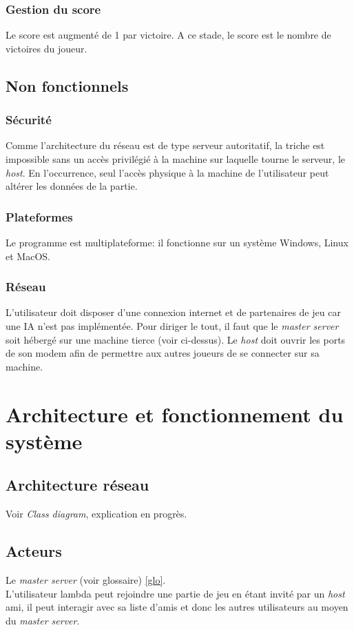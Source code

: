 \documentclass[a4paper,10pt]{article}
\begin{document}
\subsubsection{Gestion du score}
Le score est augmenté de 1 par victoire. A ce stade, le score est le nombre de victoires du joueur.
\subsection{Non fonctionnels}

\subsubsection{Sécurité}%
Comme l'architecture du réseau est de type serveur autoritatif, la triche est impossible sans un accès privilégié à la machine sur laquelle tourne le serveur, le \textit{host}. En l'occurrence, seul l'accès physique à la machine de l'utilisateur peut altérer les données de la partie.
\subsubsection{Plateformes}
Le programme est multiplateforme: il fonctionne sur un système Windows, Linux et MacOS.
\subsubsection{Réseau}
L'utilisateur doit disposer d'une connexion internet et de partenaires de jeu car une IA n'est pas implémentée.
Pour diriger le tout, il faut que le \textit{master server} soit hébergé sur une machine tierce (voir ci-dessus).
Le \textit{host} doit ouvrir les ports de son modem afin de permettre aux autres joueurs de se connecter sur sa machine.   


\section{Architecture et fonctionnement du système}


\subsection{Architecture réseau}
Voir \textit{Class diagram}, explication en progrès. 
\subsection{Acteurs}
Le \textit{master server} (voir glossaire) \ref{glo}.\\
L'utilisateur lambda peut rejoindre une partie de jeu en étant invité par un \textit{host} ami, il peut interagir avec sa liste d'amis et donc les autres utilisateurs au moyen du \textit{master server}.
\end{document}
